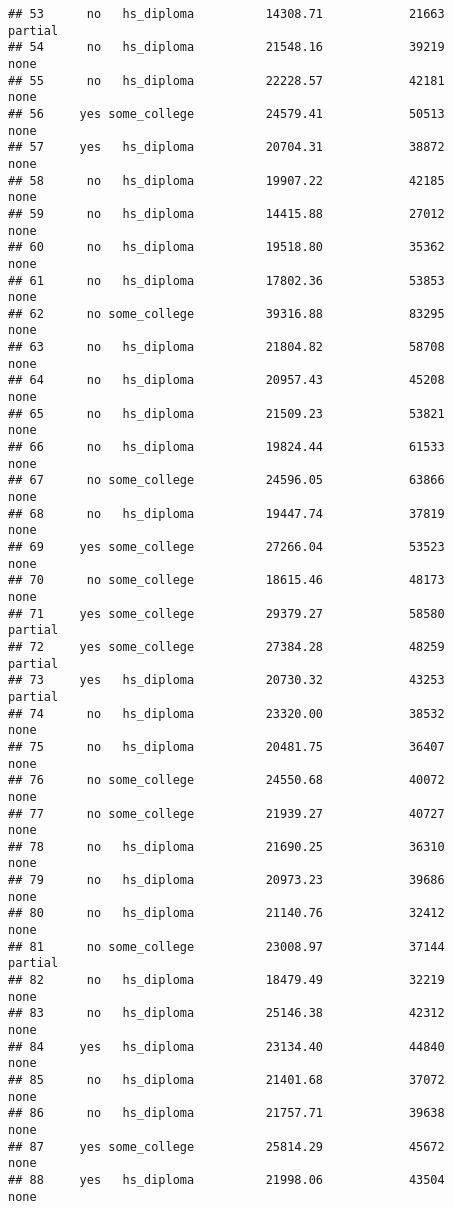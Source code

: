 \documentclass[
]{article}
\begin{document}
\begin{verbatim}
## 53      no   hs_diploma          14308.71            21663     partial
## 54      no   hs_diploma          21548.16            39219        none
## 55      no   hs_diploma          22228.57            42181        none
## 56     yes some_college          24579.41            50513        none
## 57     yes   hs_diploma          20704.31            38872        none
## 58      no   hs_diploma          19907.22            42185        none
## 59      no   hs_diploma          14415.88            27012        none
## 60      no   hs_diploma          19518.80            35362        none
## 61      no   hs_diploma          17802.36            53853        none
## 62      no some_college          39316.88            83295        none
## 63      no   hs_diploma          21804.82            58708        none
## 64      no   hs_diploma          20957.43            45208        none
## 65      no   hs_diploma          21509.23            53821        none
## 66      no   hs_diploma          19824.44            61533        none
## 67      no some_college          24596.05            63866        none
## 68      no   hs_diploma          19447.74            37819        none
## 69     yes some_college          27266.04            53523        none
## 70      no some_college          18615.46            48173        none
## 71     yes some_college          29379.27            58580     partial
## 72     yes some_college          27384.28            48259     partial
## 73     yes   hs_diploma          20730.32            43253     partial
## 74      no   hs_diploma          23320.00            38532        none
## 75      no   hs_diploma          20481.75            36407        none
## 76      no some_college          24550.68            40072        none
## 77      no some_college          21939.27            40727        none
## 78      no   hs_diploma          21690.25            36310        none
## 79      no   hs_diploma          20973.23            39686        none
## 80      no   hs_diploma          21140.76            32412        none
## 81      no some_college          23008.97            37144     partial
## 82      no   hs_diploma          18479.49            32219        none
## 83      no   hs_diploma          25146.38            42312        none
## 84     yes   hs_diploma          23134.40            44840        none
## 85      no   hs_diploma          21401.68            37072        none
## 86      no   hs_diploma          21757.71            39638        none
## 87     yes some_college          25814.29            45672        none
## 88     yes   hs_diploma          21998.06            43504        none

\end{verbatim}
\end{document}
